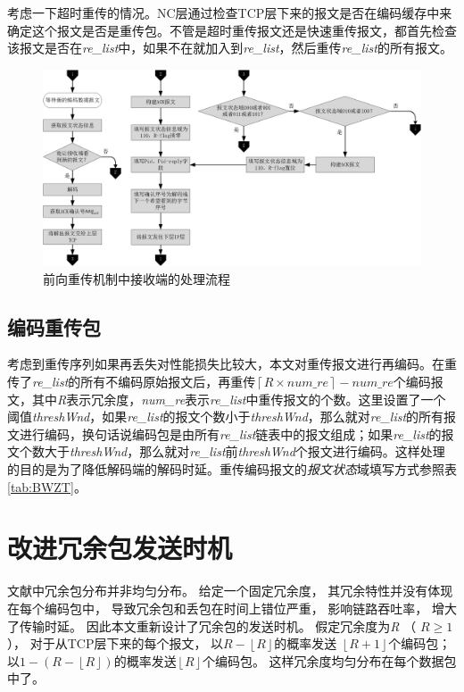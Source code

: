 \par
考虑一下超时重传的情况。NC层通过检查TCP层下来的报文是否在编码缓存中来确定这个报文是否是重传包。不管是超时重传报文还是快速重传报文，都首先检查该报文是否在\emph{re\_list}中，如果不在就加入到\emph{re\_list}，然后重传\emph{re\_list}的所有报文。
\begin{figure}[htbp]
	\centering
	\includegraphics[width=6in]{figures/sink.eps}
	\caption{前向重传机制中接收端的处理流程}
	\label{SINK_EPS}
\end{figure}
\subsection{编码重传包}
考虑到重传序列如果再丢失对性能损失比较大，本文对重传报文进行再编码。在重传了\emph{re\_list}的所有不编码原始报文后，再重传$\left\lceil {R \times num\_re} \right\rceil  - num\_re$个编码报文，其中\emph{R}表示冗余度，\emph{num\_re}表示\emph{re\_list}中重传报文的个数。这里设置了一个阈值\emph{threshWnd}，如果\emph{re\_list}的报文个数小于\emph{threshWnd}，那么就对\emph{re\_list}的所有报文进行编码，换句话说编码包是由所有\emph{re\_list}链表中的报文组成；如果\emph{re\_list}的报文个数大于\emph{threshWnd}，那么就对\emph{re\_list}前\emph{threshWnd}个报文进行编码。这样处理的目的是为了降低解码端的解码时延。重传编码报文的\emph{报文状态}域填写方式参照表\ref{tab:BWZT}。

\section{改进冗余包发送时机}
文献\cite{Sundararajan2009}中冗余包分布并非均匀分布。
给定一个固定冗余度，
其冗余特性并没有体现在每个编码包中，
导致冗余包和丢包在时间上错位严重，
影响链路吞吐率，
增大了传输时延。
因此本文重新设计了冗余包的发送时机。
假定冗余度为\emph{R} （ $R \ge 1$ ），
对于从TCP层下来的每个报文，
以$R - \left\lfloor R \right\rfloor$的概率发送 $\left\lfloor R+1 \right\rfloor$个编码包；
以$1-\left(R-\left\lfloor R \right\rfloor\right)$的概率发送$\left\lfloor R \right\rfloor$个编码包。
这样冗余度均匀分布在每个数据包中了。
